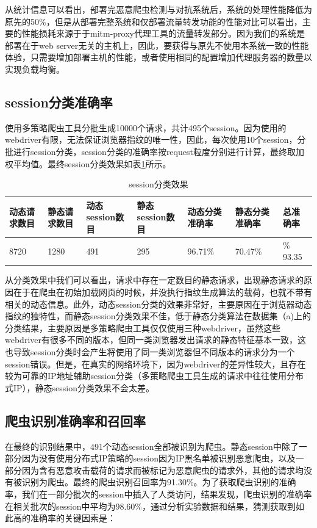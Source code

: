 \documentclass[doctor,privacy,twoside]{buaa_mac}
\begin{document}
从统计信息可以看出，部署完恶意爬虫检测与对抗系统后，系统的处理性能降低为原先的50\%，但是从部署完整系统和仅部署流量转发功能的性能对比可以看出，主要的性能损耗来源于于mitm-proxy代理工具的流量转发部分。因为我们的系统是部署在于web server无关的主机上，因此，要获得与原先不使用本系统一致的性能体验，只需要增加部署主机的性能，或者使用相同的配置增加代理服务器的数量以实现负载均衡。



\subsection{session分类准确率}
使用多策略爬虫工具分批生成10000个请求，共计495个session。因为使用的webdriver有限，无法保证浏览器指纹的唯一性，因此，每次使用10个session，分批进行session分类，session分类的准确率按request粒度分别进行计算，最终取加权平均值。最终session分类效果如表\ref{tab:session-res}所示。

\begin{table}[h]
  \caption{session分类效果}
  \label{tab:session-res}
  \centering
\begin{tabular}{|p{1.5cm}<{\centering}|p{1.5cm}<{\centering}|p{1.5cm}<{\centering}|p{1.5cm}<{\centering}|p{1.5cm}<{\centering}|p{1.5cm}<{\centering}|p{1.5cm}<{\centering}|}
    \hline
  动态请求数目 &  静态请求数目 & 动态session数目 &  静态session数目  & 动态分类准确率  & 静态分类准确率  & 总准确率 \\
    \hline
8720 & 1280 & 491 & 295 & 96.71\% & 70.47\% & \% 93.35\\

\hline
    \end{tabular}
\end{table}
\centerline{}


从分类效果中我们可以看出，请求中存在一定数目的静态请求，出现静态请求的原因在于在爬虫在初始加载网页的时候，并没执行指纹生成算法的载荷，也就不带有相关的动态信息。此外，动态session分类的效果非常好，主要原因在于浏览器动态指纹的独特性，而静态session分类效果不佳，低于静态分类算法在数据集（a)上的分类结果，主要原因是多策略爬虫工具仅仅使用三种webdriver，虽然这些webdriver有很多不同的版本，但同一类浏览器发出请求的静态特征基本一致，这也导致session分类时会产生将使用了同一类浏览器但不同版本的请求分为一个session错误。但是，在真实的网络环境下，因为webdriver的差异性较大，且存在较为可靠的IP地址辅助session分类（多策略爬虫工具生成的请求中往往使用分布式IP），静态session分类效果不会太差。


\subsection{爬虫识别准确率和召回率}
在最终的识别结果中，491个动态session全部被识别为爬虫。静态session中除了一部分因为没有使用分布式IP策略的session因为IP黑名单被识别恶意爬虫，以及一部分因为含有恶意攻击载荷的请求而被标记为恶意爬虫的请求外，其他的请求均没有被识别为爬虫。最终的爬虫识别召回率为91.30\%。为了获取爬虫识别的准确率，我们在一部分批次的session中插入了人类访问，结果发现，爬虫识别的准确率在相关批次的session中平均为98.60\%，通过分析实验数据和结果，猜测获取到如此高的准确率的关键因素是：
\end{document}
